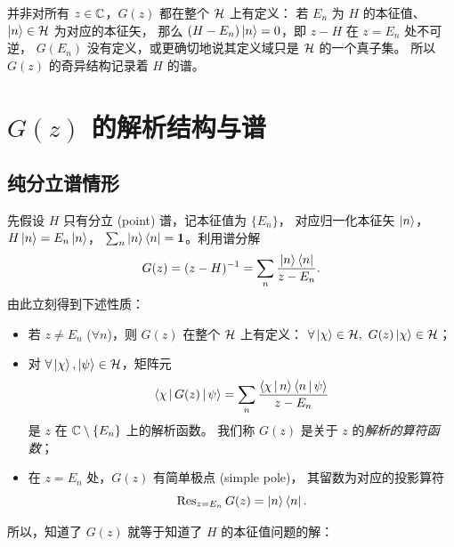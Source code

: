 \begin{remark}[定义域问题]
并非对所有 $z\in\mathbb{C}$，$G(z)$ 都在整个 $\mathcal{H}$ 上有定义：
若 $E_n$ 为 $H$ 的本征值、$\ket{n}\in\mathcal{H}$ 为对应的本征矢，
那么 $(H-E_n)\ket{n}=0$，即 $z-H$ 在 $z=E_n$ 处不可逆，
$G(E_n)$ 没有定义，或更确切地说其定义域只是 $\mathcal{H}$ 的一个真子集。
所以 $G(z)$ 的奇异结构记录着 $H$ 的谱。
\end{remark}

\section{$G(z)$ 的解析结构与谱}

\subsection{纯分立谱情形}

先假设 $H$ 只有分立 (point) 谱，记本征值为 $\{E_n\}$，
对应归一化本征矢 $\ket{n}$，$H\ket{n}=E_n\ket{n}$，
$\sum_n\ket{n}\bra{n}=\mathbf 1$。利用谱分解
\begin{equation}\label{eq:G-spectral-discrete}
  G(z) = (z-H)^{-1} = \sum_n \frac{\ket{n}\bra{n}}{z-E_n}.
\end{equation}
由此立刻得到下述性质：
\begin{itemize}
  \item 若 $z\neq E_n$ ($\forall n$)，则 $G(z)$ 在整个 $\mathcal{H}$ 上有定义：
        $\forall \ket{\chi}\in\Hilb,\ G(z)\ket{\chi}\in\Hilb$；
  \item 对 $\forall \ket{\chi},\ket{\psi}\in\mathcal{H}$，矩阵元
        \begin{equation}
          \left\langle \chi \,\middle|\, G(z) \,\middle|\, \psi \right\rangle
          = \sum_n \frac{\left\langle \chi \,\middle|\, n \right\rangle\left\langle n \,\middle|\, \psi \right\rangle}{z-E_n}
        \end{equation}
        是 $z$ 在 $\mathbb{C}\setminus\{E_n\}$ 上的解析函数。
        我们称 $G(z)$ 是关于 $z$ 的\emph{解析的算符函数}；
  \item 在 $z=E_n$ 处，$G(z)$ 有简单极点 (simple pole)，
        其留数为对应的投影算符
        \begin{equation}
          \operatorname{Res}_{z=E_n} G(z) = \ket{n}\bra{n}.
        \end{equation}
\end{itemize}
所以，知道了 $G(z)$ 就等于知道了 $H$ 的本征值问题的解：
\begin{center}
\end{center}

